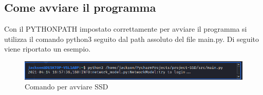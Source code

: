 \subsection{Come avviare il programma}
Con il PYTHONPATH impostato correttamente per avviare il programma si utilizza il comando python3 seguito dal path assoluto del file main.py. Di seguito viene riportato un esempio.
\begin{figure}[H]
    \centering
    \includegraphics[scale = 0.50]{components/img/avvio.png}
    \caption{ Comando per avviare SSD}
    \label{fig:comando per impostare PYTHONPATH su windows}
\end{figure}